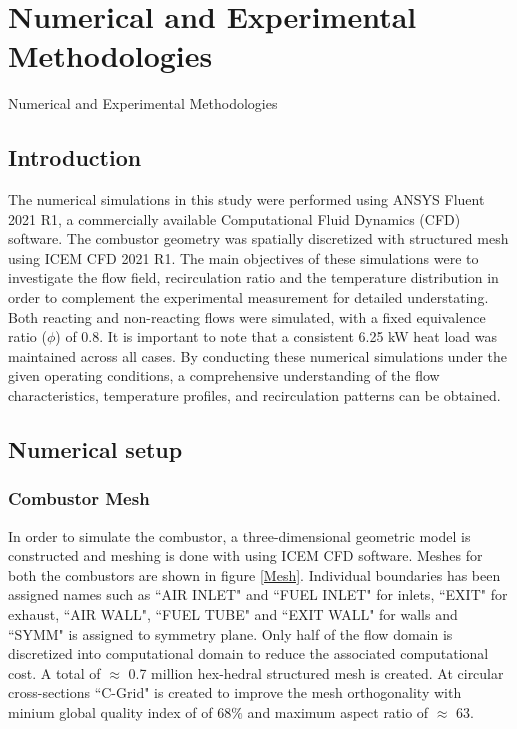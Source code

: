\chapter[Numerical and Experimental Methodologies]{Numerical and Experimental Methodologies}{Numerical and Experimental Methodologies}\label{CH4:NEM}

\section{Introduction}
The numerical simulations in this study were performed using ANSYS Fluent 2021 R1, a commercially available Computational Fluid Dynamics (CFD) software. The combustor geometry was spatially discretized with structured mesh using ICEM CFD 2021 R1. The main objectives of these simulations were to investigate the flow field, recirculation ratio and the temperature distribution in order to complement the experimental measurement for detailed understating. Both reacting and non-reacting flows were simulated, with a fixed equivalence ratio ($\phi$) of 0.8. It is important to note that a consistent 6.25 kW heat load was maintained across all cases. By conducting these numerical simulations under the given operating conditions, a comprehensive understanding of the flow characteristics, temperature profiles, and recirculation patterns can be obtained.

\section{\textbf{Numerical setup}}
\subsection{Combustor Mesh}
In order to simulate the combustor, a three-dimensional geometric model is constructed and meshing is done with using ICEM CFD software. Meshes for both the combustors are shown in figure \ref{Mesh}. Individual boundaries has been assigned names such as ``AIR INLET" and ``FUEL INLET" for inlets, ``EXIT" for exhaust, ``AIR WALL", ``FUEL TUBE" and ``EXIT WALL" for walls and ``SYMM" is assigned to symmetry plane. Only half of the flow domain is discretized into computational domain to reduce the associated computational cost. A total of $\approx$ 0.7 million hex-hedral structured mesh is created. At circular cross-sections ``C-Grid" is created to improve the mesh orthogonality with minium global quality index of of 68$\%$ and maximum aspect ratio of $\approx$ 63. 

